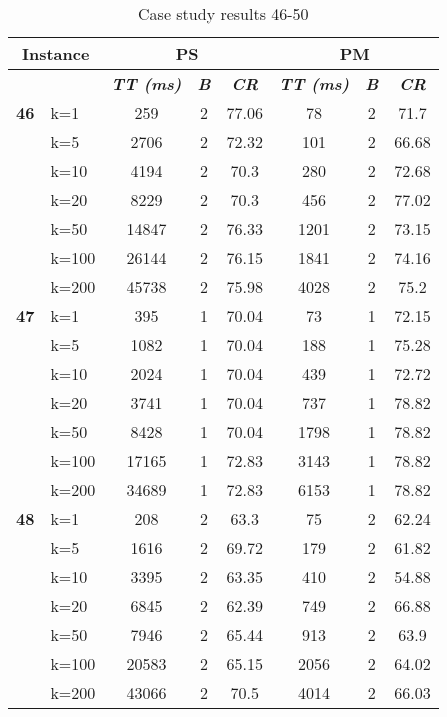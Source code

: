     \begin{table}[htbp]
    \caption{Case study results 46-50}
    \centering
    \begin{tabular}{|l|l|c|c|c|c|c|c|}
    \hline
    \multicolumn{ 2}{|c|}{\textbf{Instance}} & \multicolumn{ 3}{c|}{\textbf{PS}} & \multicolumn{ 3}{c|}{\textbf{PM}} \\ \hline
    \multicolumn{ 2}{|l|}{} & \textbf{\textit{TT (ms)}} & \textbf{\textit{B}} & \textbf{\textit{CR}} & \textbf{\textit{TT (ms)}} & \textbf{\textit{B}} & \textbf{\textit{CR}} \\ \hline
    \multicolumn{1}{|r|}{\textbf{46}} & k=1 & 259 & 2 & 77.06 & 78 & 2 & 71.7 \\ 
     & k=5 & 2706 & 2 & 72.32 & 101 & 2 & 66.68 \\ 
     & k=10 & 4194 & 2 & 70.3 & 280 & 2 & 72.68 \\ 
     & k=20 & 8229 & 2 & 70.3 & 456 & 2 & 77.02 \\ 
     & k=50 & 14847 & 2 & 76.33 & 1201 & 2 & 73.15 \\ 
     & k=100 & 26144 & 2 & 76.15 & 1841 & 2 & 74.16 \\ 
     & k=200 & 45738 & 2 & 75.98 & 4028 & 2 & 75.2 \\ \hline
    \multicolumn{1}{|r|}{\textbf{47}} & k=1 & 395 & 1 & 70.04 & 73 & 1 & 72.15 \\ 
     & k=5 & 1082 & 1 & 70.04 & 188 & 1 & 75.28 \\ 
     & k=10 & 2024 & 1 & 70.04 & 439 & 1 & 72.72 \\ 
     & k=20 & 3741 & 1 & 70.04 & 737 & 1 & 78.82 \\ 
     & k=50 & 8428 & 1 & 70.04 & 1798 & 1 & 78.82 \\ 
     & k=100 & 17165 & 1 & 72.83 & 3143 & 1 & 78.82 \\ 
     & k=200 & 34689 & 1 & 72.83 & 6153 & 1 & 78.82 \\ \hline
    \multicolumn{1}{|r|}{\textbf{48}} & k=1 & 208 & 2 & 63.3 & 75 & 2 & 62.24 \\ 
     & k=5 & 1616 & 2 & 69.72 & 179 & 2 & 61.82 \\ 
     & k=10 & 3395 & 2 & 63.35 & 410 & 2 & 54.88 \\ 
     & k=20 & 6845 & 2 & 62.39 & 749 & 2 & 66.88 \\ 
     & k=50 & 7946 & 2 & 65.44 & 913 & 2 & 63.9 \\ 
     & k=100 & 20583 & 2 & 65.15 & 2056 & 2 & 64.02 \\ 
     & k=200 & 43066 & 2 & 70.5 & 4014 & 2 & 66.03 \\ \hline

\end{tabular}
\end{table}
